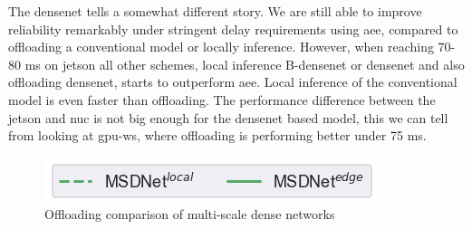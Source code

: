 The \gls{densenet} tells a somewhat different story. We are still able to improve reliability remarkably under stringent delay requirements using \gls{aee}, compared to offloading a conventional model or locally inference. However, when reaching 70-80 ms on \gls{jetson} all other schemes, local inference B-\gls{densenet} or \gls{densenet} and also offloading \gls{densenet}, starts to outperform \gls{aee}. Local inference of the conventional model is even faster than offloading. The performance difference between the \gls{jetson} and \gls{nuc} is not big enough for the \gls{densenet} based model, this we can tell from looking at \gls{gpu-ws}, where offloading is performing better under 75 ms. 

\begin{figure}
	\captionsetup[subfigure]{justification=centering, farskip=0pt,captionskip=0pt}
	\centering
	\includegraphics[width=.3\linewidth]{figures/edge/gpu_msdnet_offloading_vs_local_legend}
	\hfill
	\hfill
	\caption[Offloading comparison of multi-scale dense networks]{Offloading comparison of multi-scale dense networks}
	\label{fig:msdnet-offloading-vs-local}
\end{figure}

